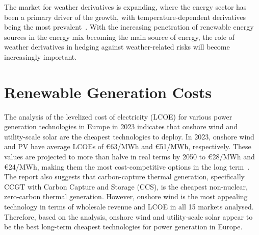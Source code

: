     The market for weather derivatives is expanding, where the energy sector has been a primary driver of the growth,
    with temperature-dependent derivatives being the most prevalent~\cite{ali_pricing_2023}.
    With the increasing penetration of renewable energy sources in the energy mix becoming the main source of energy,
    the role of weather derivatives in hedging against weather-related risks will become increasingly important.

\section{Renewable Generation Costs}
\label{sec:wind_solar_lcoe}

    The analysis of the levelized cost of electricity (LCOE) for various power generation technologies in Europe in 2023
    indicates that onshore wind and utility-scale solar are the cheapest technologies to deploy.
    In 2023, onshore wind and PV have average LCOEs of €63/MWh and €51/MWh, respectively.
    These values are projected to more than halve in real terms by 2050 to €28/MWh and €24/MWh,
    making them the most cost-competitive options in the long term~\cite{abdullah_europe_2023}.
    The report also suggests that carbon-capture thermal generation,
    specifically CCGT with Carbon Capture and Storage (CCS), is the cheapest non-nuclear, zero-carbon thermal generation.
    However, onshore wind is the most appealing technology in terms of wholesale revenue and LCOE in all 15 markets analysed.
    Therefore, based on the analysis, onshore wind and utility-scale solar appear to be the best
    long-term cheapest technologies for power generation in Europe.


%

